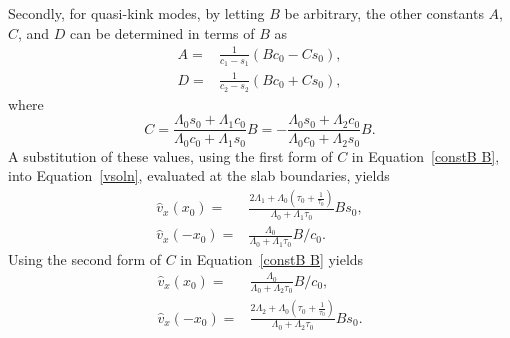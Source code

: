\documentclass[12pt]{../style-files/ociamthesis}
\begin{document}
Secondly, for quasi-kink modes, by letting $B$ be arbitrary, the other constants $A$, $C$, and $D$ can be determined in terms of $B$ as
\begin{align}
A =& \frac{1}{c_1 - s_1}(Bc_0 - Cs_0), \label{constA B} \\ 
D =& \frac{1}{c_2 - s_2}(Bc_0 + Cs_0), \label{constD B}
\end{align}
where
\begin{equation}
C = \frac{\Lambda_0s_0 + \Lambda_1c_0}{\Lambda_0c_0 + \Lambda_1s_0}B = -\frac{\Lambda_0s_0 + \Lambda_2c_0}{\Lambda_0c_0 + \Lambda_2s_0}B. \label{constB B}
\end{equation}
A substitution of these values, using the first form of $C$ in Equation~\eqref{constB B}, into Equation~\eqref{vsoln}, evaluated at the slab boundaries, yields
\begin{align}
\hat{v}_x(x_0) =& \frac{2\Lambda_1 + \Lambda_0\left(\tau_0 + \frac{1}{\tau_0}\right)}{\Lambda_0 + \Lambda_1\tau_0}Bs_0, \label{vx_01 B} \\
\hat{v}_x(-x_0) =& \frac{\Lambda_0}{\Lambda_0 + \Lambda_1\tau_0}B/c_0. \label{v-x_01 B}
\end{align}
Using the second form of $C$ in Equation~\eqref{constB B} yields
\begin{align}
\hat{v}_x(x_0) =& \frac{\Lambda_0}{\Lambda_0 + \Lambda_2\tau_0}B/c_0, \label{vx_02 B} \\
\hat{v}_x(-x_0) =& \frac{2\Lambda_2 + \Lambda_0\left(\tau_0 + \frac{1}{\tau_0}\right)}{\Lambda_0 + \Lambda_2\tau_0}Bs_0. \label{v-x_02 B}
\end{align}
\end{document}
